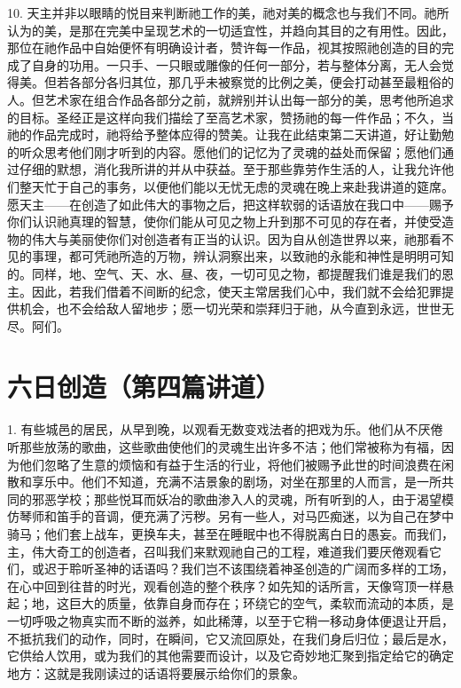10.  天主并非以眼睛的悦目来判断祂工作的美，祂对美的概念也与我们不同。祂所认为的美，是那在完美中呈现艺术的一切适宜性，并趋向其目的之有用性。因此，那位在祂作品中自始便怀有明确设计者，赞许每一作品，视其按照祂创造的目的完成了自身的功用。一只手、一只眼或雕像的任何一部分，若与整体分离，无人会觉得美。但若各部分各归其位，那几乎未被察觉的比例之美，便会打动甚至最粗俗的人。但艺术家在组合作品各部分之前，就辨别并认出每一部分的美，思考他所追求的目标。圣经正是这样向我们描绘了至高艺术家，赞扬祂的每一件作品；不久，当祂的作品完成时，祂将给予整体应得的赞美。让我在此结束第二天讲道，好让勤勉的听众思考他们刚才听到的内容。愿他们的记忆为了灵魂的益处而保留；愿他们通过仔细的默想，消化我所讲的并从中获益。至于那些靠劳作生活的人，让我允许他们整天忙于自己的事务，以便他们能以无忧无虑的灵魂在晚上来赴我讲道的筵席。愿天主——在创造了如此伟大的事物之后，把这样软弱的话语放在我口中——赐予你们认识祂真理的智慧，使你们能从可见之物上升到那不可见的存在者，并使受造物的伟大与美丽使你们对创造者有正当的认识。因为自从创造世界以来，祂那看不见的事理，都可凭祂所造的万物，辨认洞察出来，以致祂的永能和神性是明明可知的。同样，地、空气、天、水、昼、夜，一切可见之物，都提醒我们谁是我们的恩主。因此，若我们借着不间断的纪念，使天主常居我们心中，我们就不会给犯罪提供机会，也不会给敌人留地步；愿一切光荣和崇拜归于祂，从今直到永远，世世无尽。阿们。\par



\section{六日创造（第四篇讲道）}

\par

1. 有些城邑的居民，从早到晚，以观看无数变戏法者的把戏为乐。他们从不厌倦听那些放荡的歌曲，这些歌曲使他们的灵魂生出许多不洁；他们常被称为有福，因为他们忽略了生意的烦恼和有益于生活的行业，将他们被赐予此世的时间浪费在闲散和享乐中。他们不知道，充满不洁景象的剧场，对坐在那里的人而言，是一所共同的邪恶学校；那些悦耳而妖冶的歌曲渗入人的灵魂，所有听到的人，由于渴望模仿琴师和笛手的音调，便充满了污秽。另有一些人，对马匹痴迷，以为自己在梦中骑马；他们套上战车，更换车夫，甚至在睡眠中也不得脱离白日的愚妄。而我们，主，伟大奇工的创造者，召叫我们来默观祂自己的工程，难道我们要厌倦观看它们，或迟于聆听圣神的话语吗？我们岂不该围绕着神圣创造的广阔而多样的工场，在心中回到往昔的时光，观看创造的整个秩序？如先知的话所言，天像穹顶一样悬起；地，这巨大的质量，依靠自身而存在；环绕它的空气，柔软而流动的本质，是一切呼吸之物真实而不断的滋养，如此稀薄，以至于它稍一移动身体便退让开启，不抵抗我们的动作，同时，在瞬间，它又流回原处，在我们身后归位；最后是水，它供给人饮用，或为我们的其他需要而设计，以及它奇妙地汇聚到指定给它的确定地方：这就是我刚读过的话语将要展示给你们的景象。\par


